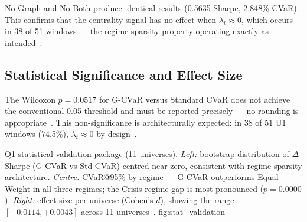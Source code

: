 No Graph and No Both produce identical results (0.5635 Sharpe, 2.848\%
CVaR). This confirms that the centrality signal has no effect when
$\lambda_t \approx 0$, which occurs in 38 of 51 windows — the
regime-sparsity property operating exactly as intended~\citep{ang2002}.

\subsection{Statistical Significance and Effect Size}

\begin{table}[htbp]
\centering
\caption{Pooled cross-universe statistical tests (Table~13B): 11
         universes, 139,104 paired daily observations. Wilcoxon
         signed-rank used as primary test (Shapiro-Wilk rejects
         normality for all universes~\citep{cont2001}).
         $^{**}p < 0.01$; ns: not significant at $\alpha = 0.05$.}
\label{tab:stats}
\end{table}

The Wilcoxon $p = 0.0517$ for G-CVaR versus Standard CVaR does not
achieve the conventional 0.05 threshold and must be reported precisely —
no rounding is appropriate~\citep{harvey2016}. This non-significance is
architecturally expected: in 38 of 51 U1 windows (74.5\%), $\lambda_t
\approx 0$ by design~\citep{ang2002,hamilton1989}.

  {Q1 statistical validation package (11 universes). \textit{Left:}
   bootstrap distribution of $\Delta$Sharpe (G-CVaR vs Std CVaR)
   centred near zero, consistent with regime-sparsity architecture.
   \textit{Centre:} CVaR@95\% by regime — G-CVaR outperforms Equal
   Weight in all three regimes; the Crisis-regime gap is most
   pronounced ($p = 0.0000$). \textit{Right:} effect size per
   universe (Cohen's $d$), showing the range $[-0.0114, +0.0043]$
   across 11 universes~\citep{harvey2016,cont2001}.}
  {fig:stat_validation}

